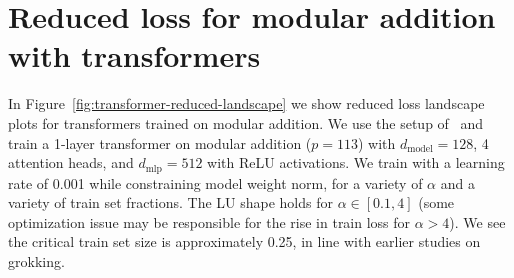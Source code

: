 \documentclass{article} %
\begin{document}



\section{Reduced loss for modular addition with transformers}

In Figure~\ref{fig:transformer-reduced-landscape} we show reduced loss landscape plots for transformers trained on modular addition. We use the setup of~\cite{neel2022} and train a 1-layer transformer on modular addition ($p = 113$) with $d_\text{model} = 128$, 4 attention heads, and $d_\text{mlp} = 512$ with ReLU activations. We train with a learning rate of 0.001 while constraining model weight norm, for a variety of $\alpha$ and a variety of train set fractions. The LU shape holds for $\alpha \in [0.1, 4]$ (some optimization issue may be responsible for the rise in train loss for $\alpha > 4$). We see the critical train set size is approximately 0.25, in line with earlier studies on grokking.
\end{document}
